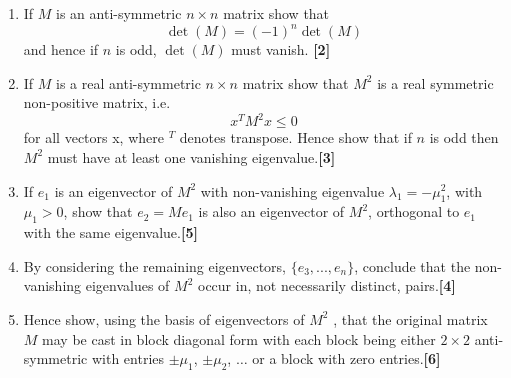 \documentclass[a4paper]{article}
\begin{document}
\newpage
\begin{qns}\leavevmode
\begin{enumerate}[label=(\roman*)]
\item If $M$ is an anti-symmetric $n\times n$ matrix show that
$$\det(M) = (−1)^{n}\det(M)$$
and hence if $n$ is odd, $\det(M)$ must vanish. \hfill \textbf{[2]}
\item If $M$ is a real anti-symmetric $n\times n$ matrix show that $M^2$ is a real symmetric non-positive matrix, i.e. $$x^TM^2x\leq0$$
for all vectors x, where $^T$ denotes transpose. Hence show that if $n$ is odd then $M^2$ must have at least one vanishing eigenvalue.\hfill \textbf{[3]}
\item If $e_1$ is an eigenvector of $M^2$ with non-vanishing eigenvalue $\lambda_1=-\mu_1^2$, with $\mu_1>0$,
show that $e_2 = Me_1$ is also an eigenvector of $M^2$, orthogonal to $e_1$ with the same eigenvalue.\hfill \textbf{[5]}
\item By considering the remaining eigenvectors, $\{e_3,...,e_n\}$, conclude that the non-vanishing eigenvalues of $M^2$ occur in, not necessarily distinct, pairs.\hfill \textbf{[4]}
\item Hence show, using the basis of eigenvectors of $M^2$ , that the original matrix $M$ may be cast in block diagonal form with each block being either $2\times 2$ anti-symmetric with entries $\pm\mu_1$, $\pm\mu_2$, $\dots$ or a block with zero entries.\hfill \textbf{[6]}
\end{enumerate}
\end{qns}
\end{document}

